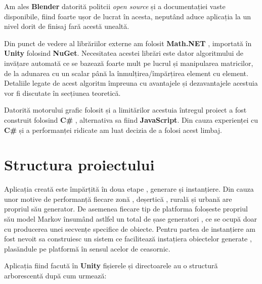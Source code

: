 Am ales \textbf{Blender} datorită politcii \textit{open source} și a documentației vaste disponibile, fiind foarte ușor de lucrat în acesta, neputând aduce aplicația la un nivel dorit de finisaj fară acestă unealtă.\par

Din punct de vedere al librăriilor externe am folosit \textbf{Math.NET} , importată în \textbf{Unity} folosind \textbf{NuGet}. Necesitatea acestei librări este dator algoritmului de invățare automată ce se bazează foarte mult pe lucrul și manipularea matricilor, de la adunarea cu un scalar până la înmulțirea/împărțirea element cu element. Detaliile legate de acest algoritm împreuna cu avantajele și dezavantajele acestuia vor fi discutate în secțiunea teoretică.\par

Datorită motorului grafic folosit și a limitărilor acestuia întregul proiect a fost construit folosind \textbf{C\#} , alternativa sa fiind \textbf{JavaScript}. Din cauza experienței cu \textbf{C\#} și a performanței ridicate am luat decizia de a folosi acest limbaj.\par


\section{Structura proiectului}

Aplicația creată este împărțită în doua etape , generare și instanțiere. Din cauza unor motive de performanță fiecare zonă  , deșertică , rurală și urbană are propriul său generator. De asemenea fiecare tip de platforma foloșeste propriul său model Markov însumând astlfel un total de șase generatori , ce se ocupă doar cu producerea unei secvențe specifice de obiecte. Pentru partea de instanțiere am fost nevoit sa construiesc un sistem ce facilitează instațiera obiectelor generate , plasăndule pe platformă în sensul acelor de ceasornic.\par

Aplicația fiind facută în \textbf{Unity} fișierele și directoarele au o structură arborescentă după cum urmează: \par

\par

